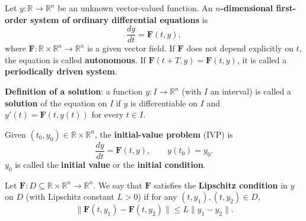 \begin{definition}\label{def:ode}
Let $y: \mathbb{R} \to \mathbb{R}^n$ be an unknown vector-valued function. An \textbf{$n$-dimensional first-order system of ordinary differential equations} is
\[
\frac{dy}{dt} = \mathbf{F}(t, y),
\]
where $\mathbf{F}: \mathbb{R} \times \mathbb{R}^n \to \mathbb{R}^n$ is a given vector field. If $\mathbf{F}$ does not depend explicitly on $t$, the equation is called \textbf{autonomous}. If $\mathbf{F}(t+T, y) = \mathbf{F}(t, y)$, it is called a \textbf{periodically driven system}.

\textbf{Definition of a solution}: a function $y: I \to \mathbb{R}^n$ (with $I$ an interval) is called a \textbf{solution} of the equation on $I$ if $y$ is differentiable on $I$ and $y'(t) = \mathbf{F}(t, y(t))$ for every $t \in I$.
\end{definition}

\begin{definition}\label{def:ivp}
Given $(t_0, y_0) \in \mathbb{R} \times \mathbb{R}^n$, the \textbf{initial-value problem} (IVP) is
\[
\frac{dy}{dt} = \mathbf{F}(t, y), \qquad y(t_0) = y_0.
\]
$y_0$ is called the \textbf{initial value} or the \textbf{initial condition}.
\end{definition}

\begin{definition}\label{def:lipschitz}
Let $\mathbf{F}: D \subseteq \mathbb{R} \times \mathbb{R}^n \to \mathbb{R}^n$. We say that $\mathbf{F}$ satisfies the \textbf{Lipschitz condition} in $y$ on $D$ (with Lipschitz constant $L > 0$) if for any $(t, y_1), (t, y_2) \in D$,
\[
\|\mathbf{F}(t, y_1) - \mathbf{F}(t, y_2)\| \le L\|y_1 - y_2\|.
\]
\end{definition}

